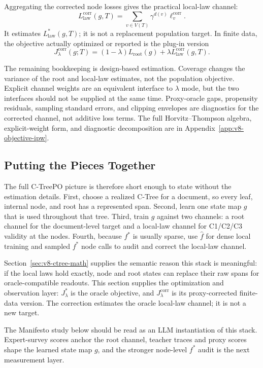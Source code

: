 Aggregating the corrected node losses gives the practical local-law channel:
\[
  L_{\mathrm{law}}^{\mathrm{corr}}(g,T)
  =
  \sum_{v\in V(T)}\gamma^{d(v)}\ell_v^{\mathrm{corr}} .
\]
It estimates \(L_{\mathrm{law}}^\ast(g,T)\); it is not a replacement population
target. In finite data, the objective actually optimized or reported is the
plug-in version
\begin{equation}
\label{eq:v8-corrected-objective}
  J_\lambda^{\mathrm{corr}}(g;T)
  =
  (1-\lambda)L_{\mathrm{root}}(g)
  +
  \lambda L_{\mathrm{law}}^{\mathrm{corr}}(g,T).
\end{equation}

The remaining bookkeeping is design-based estimation. Coverage changes the
variance of the root and local-law estimates, not the population objective.
Explicit channel weights are an equivalent interface to \(\lambda\) mode, but
the two interfaces should not be supplied at the same time. Proxy-oracle gaps,
propensity residuals, sampling standard errors, and clipping envelopes are
diagnostics for the corrected channel, not additive loss terms. The full
Horvitz--Thompson algebra, explicit-weight form, and diagnostic decomposition
are in Appendix~\ref{app:v8-objective-ipw}.

\subsection{Putting the Pieces Together}

The full C-TreePO picture is therefore short enough to state without the
estimation details. First, choose a realized C-Tree for a document, so every
leaf, internal node, and root has a represented span. Second, learn one state
map \(g\) that is used throughout that tree. Third, train \(g\) against two
channels: a root channel for the document-level target and a local-law channel
for C1/C2/C3 validity at the nodes. Fourth, because \(f^\ast\) is usually
sparse, use \(\widehat f\) for dense local training and sampled \(f^\ast\)
node calls to audit and correct the local-law channel.

Section~\ref{sec:v8-ctree-math} supplies the semantic reason this stack is
meaningful: if the local laws hold exactly, node and root states can replace
their raw spans for oracle-compatible readouts. This section supplies the
optimization and observation layer: \(J_\lambda^\ast\) is the oracle objective,
and \(J_\lambda^{\mathrm{corr}}\) is its proxy-corrected finite-data version.
The correction estimates the oracle local-law channel; it is not a new target.

The Manifesto study below should be read as an LLM instantiation of this stack.
Expert-survey scores anchor the root channel, teacher traces and proxy scores
shape the learned state map \(g\), and the stronger node-level \(f^\ast\) audit
is the next measurement layer.
